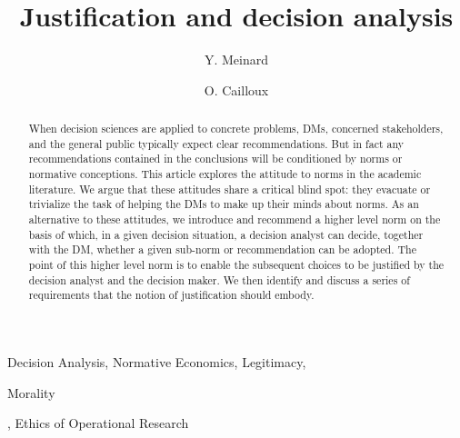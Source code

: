 \documentclass[preprint, french, english, 11pt, authoryear]{elsarticle}%
\newcommand{\ac}[1]{#1}
\newcommand{\acp}[1]{#1s}
\newcommand{\acresetall}{}
\begin{document}
\hypersetup{citecolor=black}
\title{Justification and decision analysis}

\author[ld]{Y. Meinard}
\author[ld]{O. Cailloux}
\address[ld]{Universit\'e Paris-Dauphine, PSL Research University, CNRS, UMR [7243], LAMSADE, 75016 PARIS, FRANCE}

\begin{abstract}
\begin{changebar}When decision sciences are applied to concrete problems, \acp{DM}, concerned stakeholders, and the general public typically expect clear recommendations.
But in fact any recommendations contained in the conclusions will be conditioned by norms or normative conceptions.
This article explores the attitude to norms in the academic literature. We argue that these attitudes share a critical blind spot: they evacuate or trivialize the task of helping the \acp{DM} to make up their minds about norms.
As an alternative to these attitudes, we introduce and recommend a higher level norm on the basis of which, in a given decision situation, a decision analyst can decide, together with the \ac{DM}, whether a given sub-norm or recommendation can be adopted.
The point of this higher level norm is to enable the subsequent choices to be justified by the decision analyst and the decision maker. We then identify and discuss a series of requirements that the notion of justification should embody.\end{changebar}

\end{abstract}
\acresetall
\begin{keyword}
Decision Analysis, Normative Economics, Legitimacy, \begin{changebar}Morality\end{changebar}, Ethics of Operational Research
\end{keyword}
\end{document}
